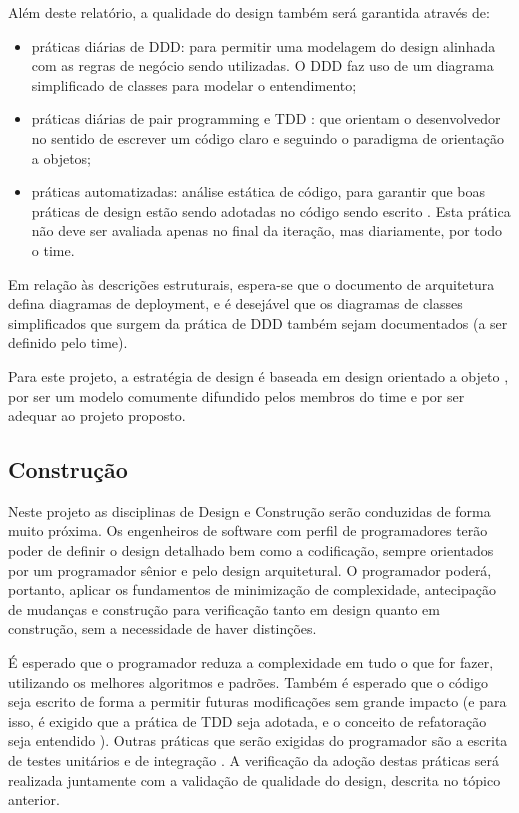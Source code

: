 \documentclass[12pt,journal,compsoc]{IEEEtran}
\begin{document}
Além deste relatório, a qualidade do design também será garantida através de:
\begin{itemize}
\item práticas diárias de DDD: para permitir uma modelagem do design alinhada com as regras de negócio sendo utilizadas. O DDD faz uso de um diagrama simplificado de classes para modelar o entendimento;
\item práticas diárias de pair programming e TDD \cite{begel_pair_2008}\cite{nagappan_realizing_2008}: que orientam o desenvolvedor no sentido de escrever um código claro e seguindo o paradigma de orientação a objetos;
\item práticas automatizadas: análise estática de código, para garantir que boas práticas de design estão sendo adotadas no código sendo escrito \cite{karpov_static_code_analysis}. Esta prática não deve ser avaliada apenas no final da iteração, mas diariamente, por todo o time.
\end{itemize}

Em relação às descrições estruturais, espera-se que o documento de arquitetura defina diagramas de deployment, e é desejável que os diagramas de classes simplificados que surgem da prática de DDD também sejam documentados (a ser definido pelo time).

Para este projeto, a estratégia de design é baseada em design orientado a objeto \cite{society_software_2004}, por ser um modelo comumente difundido pelos membros do time e por ser adequar ao projeto proposto.


\subsection{Construção}

Neste projeto as disciplinas de Design e Construção \cite{society_software_2004} serão conduzidas de forma muito próxima. Os engenheiros de software com perfil de programadores terão poder de definir o design detalhado bem como a codificação, sempre orientados por um programador sênior e pelo design arquitetural. O programador poderá, portanto, aplicar os fundamentos de minimização de complexidade, antecipação de mudanças e construção para verificação tanto em design quanto em construção, sem a necessidade de haver distinções. %

É esperado que o programador reduza a complexidade em tudo o que for fazer, utilizando os melhores algoritmos e padrões. Também é esperado que o código seja escrito de forma a permitir futuras modificações sem grande impacto (e para isso, é exigido que a prática de TDD seja adotada, e o conceito de refatoração seja entendido \cite{Fowler1999}). Outras práticas que serão exigidas do programador são a escrita de testes unitários e de integração \cite{unit_int_func_testing}. A verificação da adoção destas práticas será realizada juntamente com a validação de qualidade do design, descrita no tópico anterior. 
\end{document}
